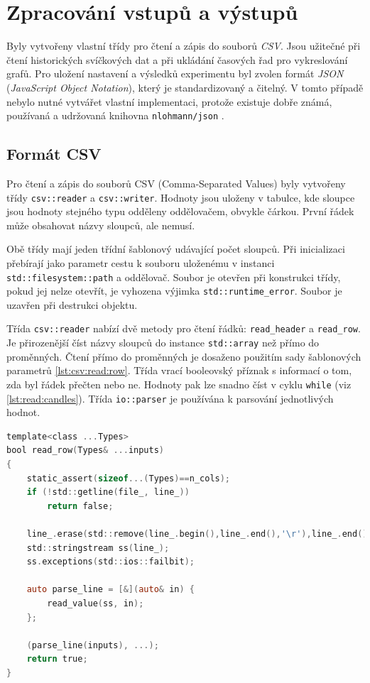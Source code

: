 \chapter{Zpracování vstupů a výstupů}
Byly vytvořeny vlastní třídy pro čtení a zápis do souborů \textit{CSV}.
Jsou užitečné při čtení historických svíčkových dat a při ukládání časových řad pro vykreslování grafů.
Pro uložení nastavení a výsledků experimentu byl zvolen formát \textit{JSON} (\textit{JavaScript Object Notation}), který je standardizovaný a čitelný.
V tomto případě nebylo nutné vytvářet vlastní implementaci, protože existuje dobře známá, používaná a udržovaná knihovna \texttt{nlohmann/json} \cite{lohmann}.

\section{Formát CSV}
Pro čtení a zápis do souborů CSV (Comma-Separated Values) byly vytvořeny třídy \texttt{csv::reader} a \texttt{csv::writer}.
Hodnoty jsou uloženy v tabulce, kde sloupce jsou hodnoty stejného typu odděleny oddělovačem, obvykle čárkou.
První řádek může obsahovat názvy sloupců, ale nemusí.

Obě třídy mají jeden třídní šablonový udávající počet sloupců.
Při inicializaci přebírají jako parametr cestu k souboru uloženému v instanci \texttt{std::filesystem::path} a oddělovač.
Soubor je otevřen při konstrukci třídy, pokud jej nelze otevřít, je vyhozena výjimka \texttt{std::runtime\_error}.
Soubor je uzavřen při destrukci objektu.

Třída \texttt{csv::reader} nabízí dvě metody pro čtení řádků: \texttt{read\_header} a \texttt{read\_row}.
Je přirozenější číst názvy sloupců do instance \texttt{std::array} než přímo do proměnných.
Čtení přímo do proměnných je dosaženo použitím sady šablonových parametrů \ref{lst:csv:read:row}.
Třída vrací booleovský příznak s informací o tom, zda byl řádek přečten nebo ne.
Hodnoty pak lze snadno číst v cyklu \texttt{while} (viz \ref{lst:read:candles}).
Třída \texttt{io::parser} je používána k parsování jednotlivých hodnot.

\begin{lstlisting}[caption={~Implementace čtení řádky třídy \texttt{io::csv::reader}},label={lst:csv:read:row},captionpos=t,abovecaptionskip=-\medskipamount,belowcaptionskip=\medskipamount,language=C]
template<class ...Types>
bool read_row(Types& ...inputs)
{
    static_assert(sizeof...(Types)==n_cols);
    if (!std::getline(file_, line_))
        return false;

    line_.erase(std::remove(line_.begin(),line_.end(),'\r'),line_.end());
    std::stringstream ss(line_);
    ss.exceptions(std::ios::failbit);

    auto parse_line = [&](auto& in) {
        read_value(ss, in);
    };

    (parse_line(inputs), ...);
    return true;
}
\end{lstlisting}

